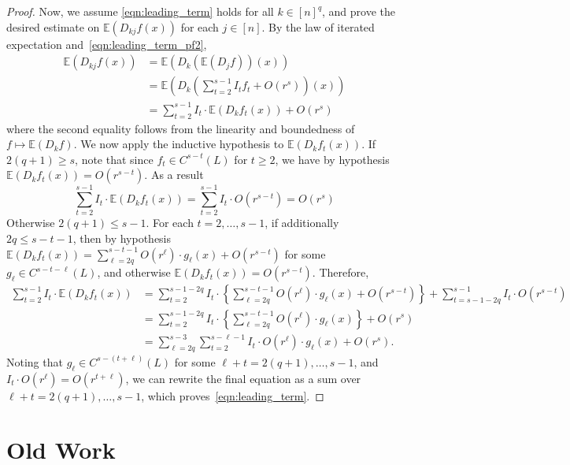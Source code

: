 \documentclass{article}
\newcommand{\1}{\mathbf{1}}
\newcommand{\Ebb}{\mathbb{E}}
\theoremstyle{alden}
\theoremstyle{aldenthm}
\theoremstyle{definition}
\theoremstyle{remark}
\begin{document}
\begin{proof}
	Now, we assume \eqref{eqn:leading_term} holds for all $k \in [n]^q$, and prove the desired estimate on $\Ebb(D_{kj}f(x))$ for each $j \in [n]$. By the law of iterated expectation and~\eqref{eqn:leading_term_pf2},
	\begin{align*}
	\Ebb(D_{kj}f(x)) & = \Ebb(D_k(\Ebb(D_jf))(x)) \\
	& = \Ebb\left(D_k\left(\sum_{t = 2}^{s - 1} I_t f_t + O(r^s)\right)(x)\right) \\
	& = \sum_{t = 2}^{s - 1} I_t \cdot \Ebb(D_kf_t(x)) + O(r^s)
	\end{align*}
	where the second equality follows from the linearity and boundedness of $f \mapsto \Ebb(D_kf)$. We now apply the inductive hypothesis to $\Ebb(D_kf_t(x))$. If $2(q + 1) \geq s$, note that since $f_t \in C^{s - t}(L)$ for $t \geq 2$, we have by hypothesis $\Ebb(D_kf_t(x)) = O(r^{s - t})$. As a result
	\begin{equation*}
	\sum_{t = 2}^{s - 1} I_t \cdot \Ebb(D_kf_t(x)) = \sum_{t = 2}^{s - 1} I_t \cdot O(r^{s - t}) = O(r^s)
	\end{equation*} 
	Otherwise $2(q + 1) \leq s - 1$. For each $t = 2,\ldots, s - 1$, if additionally  $2q \leq s - t - 1$, then by hypothesis $\Ebb(D_kf_t(x)) = \sum_{\ell = 2q}^{s - t - 1} O(r^{\ell}) \cdot g_{\ell}(x) + O(r^{s - t})$ for some $g_{\ell} \in C^{s - t - \ell}(L)$, and otherwise $\Ebb(D_kf_t(x)) = O(r^{s - t})$. Therefore,
	\begin{align*}
	\sum_{t = 2}^{s - 1} I_t \cdot \Ebb(D_kf_t(x)) & = \sum_{t = 2}^{s - 1 - 2q} I_t \cdot \left\{\sum_{\ell = 2q}^{s - t - 1} O(r^{\ell}) \cdot g_{\ell}(x) + O(r^{s - t}) \right\} + \sum_{t = s - 1 - 2q}^{s - 1}I_{t} \cdot O(r^{s - t}) \\
	& = \sum_{t = 2}^{s - 1 - 2q} I_t \cdot \left\{\sum_{\ell = 2q}^{s - t - 1} O(r^{\ell}) \cdot g_{\ell}(x)\right\}  + O(r^s) \\
	& = \sum_{\ell = 2q}^{s - 3} \sum_{t = 2}^{s - \ell - 1} I_t \cdot O(r^{\ell}) \cdot g_{\ell}(x) + O(r^s).
	\end{align*}
	Noting that $g_{\ell} \in C^{s - (t + \ell)}(L)$ for some $\ell + t = 2(q + 1),\ldots,s - 1$, and $I_t \cdot O(r^{\ell}) = O(r^{t + \ell})$, we can rewrite the final equation as a sum over $\ell + t = 2(q + 1),\ldots,s - 1$, which proves~\eqref{eqn:leading_term}.
\end{proof}

\section{Old Work}
\end{document}
